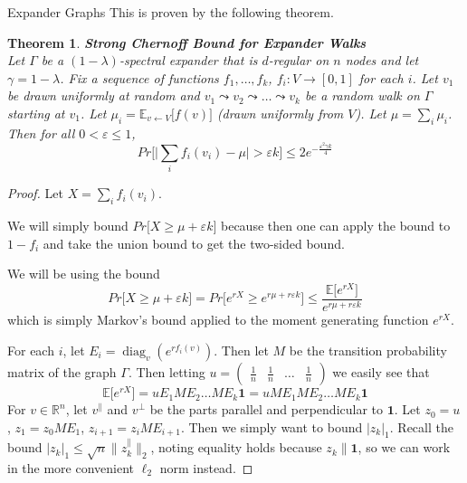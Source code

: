 \documentclass{article}
\newcommand{\E}{\mathbb E}
\newcommand{\eps}{\varepsilon}
\newcommand{\from}{\leftarrow}
\DeclareMathOperator{\diag}{diag}
\newtheorem{thm}{Theorem}
\begin{document}
\begin{section}{Expander Graphs}
  This is proven by the following theorem.

  \begin{thm}{\textbf{Strong Chernoff Bound for Expander Walks}\\}
    Let $\Gamma$ be a $(1-\lambda)$-spectral expander that is $d$-regular on $n$ nodes and let $\gamma = 1 - \lambda$.
    Fix a sequence of functions $f_1,\ldots,f_k$, $f_i : V \to [0,1]$ for each $i$.
    Let $v_1$ be drawn uniformly at random and $v_1 \leadsto v_2 \leadsto \ldots \leadsto v_k$ be a random walk on $\Gamma$ starting at $v_1$.
    Let $\mu_i = \E_{v \from V}\big[f(v)\big]$ (drawn uniformly from $V$).
    Let $\mu = \sum_i \mu_i$.
    Then for all $0 < \eps \leq 1$,
    \begin{equation}
      Pr\bigg[\big| \sum_i f_i(v_i) - \mu \big| > \eps k\bigg] \leq 2e^{-\frac{\eps^2 \gamma k}{4}}
    \end{equation}
  \end{thm}

  \begin{proof}
    Let $X = \sum_i f_i(v_i)$.

  We will simply bound $Pr\big[X \geq \mu + \eps k\big]$ because then one can apply the bound to $1 - f_i$ and take the union bound to get the two-sided bound.

  We will be using the bound 
  $$
  Pr\big[X \geq \mu + \eps k\big] = Pr\big[ e^{rX} \geq e^{r\mu + r\eps k}\big] \leq \frac{\E\big[e^{rX}\big]}{e^{r\mu + r\eps k}}
  $$
  which is simply Markov's bound applied to the moment generating function $e^{rX}$.

  For each $i$, let $E_i = \diag_v(e^{rf_i(v)})$.
  Then let $M$ be the transition probability matrix of the graph $\Gamma$.
    Then letting $u = \begin{pmatrix} \frac{1}{n} & \frac{1}{n} & \hdots & \frac{1}{n} \end{pmatrix}$ we easily see that
      $$
      \E\big[e^{rX}\big] = uE_1ME_2\hdots ME_k \mathbf 1 = uME_1ME_2\hdots ME_k \mathbf 1
      $$
  For $v \in \mathbb R^n$, let $v^\parallel$ and $v^\perp$ be the parts parallel and perpendicular to $\mathbf 1$.
    Let $z_0 = u$, $z_1 = z_0ME_1$, $z_{i+1} = z_{i}ME_{i+1}$.
    Then we simply want to bound $|z_k|_1$.
    Recall the bound $|z_k|_1 \leq \sqrt{n}\lVert z_k^\parallel\rVert_2$, noting equality holds because $z_k \parallel \mathbf 1$, so we can work in the more convenient $\ell_2$ norm instead.


\end{proof}
\end{section}
\end{document}
